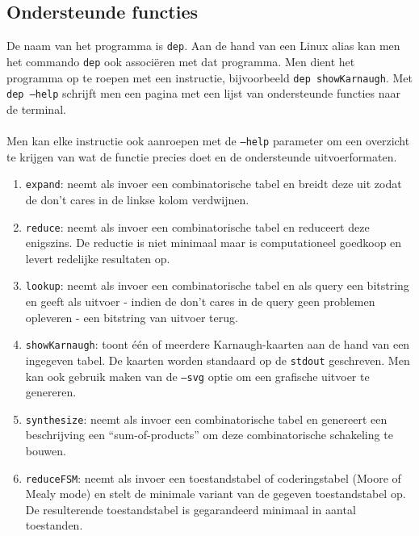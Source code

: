 \subsection{Ondersteunde functies}
De naam van het programma is \texttt{dep}. Aan de hand van een Linux alias kan men het commando \texttt{dep} ook associ\"eren met dat programma. Men dient het programma op te roepen met een instructie, bijvoorbeeld \texttt{dep showKarnaugh}. Met \texttt{dep --help} schrijft men een pagina met een lijst van ondersteunde functies naar de terminal.

\paragraph{}
Men kan elke instructie ook aanroepen met de \texttt{--help} parameter om een overzicht te krijgen van wat de functie precies doet en de ondersteunde uitvoerformaten.

\begin{enumerate}
 \item \texttt{expand}: neemt als invoer een combinatorische tabel en breidt deze uit zodat de don't cares in de linkse kolom verdwijnen.
 \item \texttt{reduce}: neemt als invoer een combinatorische tabel en reduceert deze enigszins. De reductie is niet minimaal maar is computationeel goedkoop en levert redelijke resultaten op.
 \item \texttt{lookup}: neemt als invoer een combinatorische tabel en als query een bitstring en geeft als uitvoer - indien de don't cares in de query geen problemen opleveren - een bitstring van uitvoer terug.
 \item \texttt{showKarnaugh}: toont \'e\'en of meerdere Karnaugh-kaarten aan de hand van een ingegeven tabel. De kaarten worden standaard op de \texttt{stdout} geschreven. Men kan ook gebruik maken van de \texttt{--svg} optie om een grafische uitvoer te genereren.
 \item \texttt{synthesize}: neemt als invoer een combinatorische tabel en genereert een beschrijving een ``sum-of-products'' om deze combinatorische schakeling te bouwen.
 \item \texttt{reduceFSM}: neemt als invoer een toestandstabel of coderingstabel (Moore of Mealy mode) en stelt de minimale variant van de gegeven toestandstabel op. De resulterende toestandstabel is gegarandeerd minimaal in aantal toestanden.
\end{enumerate}

